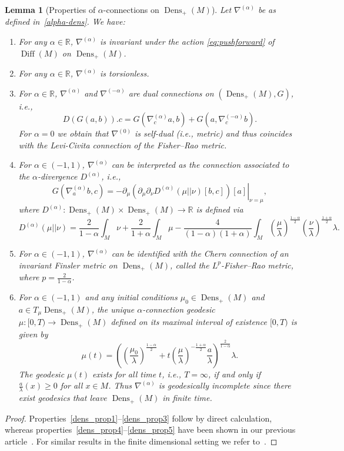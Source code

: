\documentclass[11pt,reqno]{amsart}
\newtheorem{lemma}[theorem]{Lemma}
\theoremstyle{definition}
\newcommand{\R}{\mathbb R}
\newcommand{\dx}{\lambda}
\newcommand{\Dens}{\operatorname{Dens}_+(M)}
\newcommand{\Diff}{\operatorname{Diff}(M)}
\newcommand{\GFR}{G}
\begin{document}
\begin{lemma}[Properties of $\alpha$-connections on $\Dens$]\label{lem:alphacon_dens}
Let $\nabla^{(\alpha)}$ be %
as defined in~\eqref{alpha-dens}. We have:
\begin{enumerate}[label=$(\alph*)$]
\item\label{dens_prop1}For any $\alpha\in \mathbb R$, %
$\nabla^{(\alpha)}$ is invariant under the action \eqref{eq:pushforward} of $\Diff$ on $\Dens$. 
\item For any $\alpha\in \R$, $\nabla^{(\alpha)}$ is torsionless.
\item\label{dens_prop2} For $\alpha\in \mathbb R$, $\nabla^{(\alpha)}$ and $\nabla^{(-\alpha)}$ are dual connections on $(\Dens,\GFR)$, i.e.,
\[
D(G(a,b)).c = G(\nabla^{(\alpha)}_c a,b) + G(a,\nabla^{(-\alpha)}_c b).
\]
For $\alpha=0$ we obtain that $\nabla^{(0)}$ is self-dual (i.e., metric) and thus coincides with the Levi-Civita connection of the Fisher--Rao metric.  
\item\label{dens_prop3} For $\alpha\in (-1,1)$, $\nabla^{(\alpha)}$ 
can be interpreted as the connection associated to the $\alpha$-divergence $D^{(\alpha)}$, i.e.,
$$G(\nabla_a^{(\alpha)}b,c)=-\left.\partial_\mu(\partial_\mu\partial_\nu D^{(\alpha)}(\mu||\nu)[b,c])[a]\right|_{\nu=\mu},$$
where $D^{(\alpha)}:\Dens\times\Dens\to\mathbb R$ is defined  via
\begin{equation}\label{eq:alphadiv}
    D^{(\alpha)}(\mu||\nu) = \frac{2}{1-\alpha}\int_M \nu + \frac{2}{1+\alpha}\int_M \mu -\frac{4}{(1-\alpha)(1+\alpha)}\int_M \left(\frac{\mu}{\dx}\right)^\frac{1-\alpha}{2}\left(\frac{\nu}{\dx}\right)^{\frac{1+\alpha}{2}}\dx.
\end{equation}
\item\label{dens_prop4} For $\alpha\in (-1,1)$,  $\nabla^{(\alpha)}$ can be identified with the Chern connection of an invariant Finsler metric on $\Dens$, called the $L^p$-Fisher--Rao metric, where $p=\frac{2}{1-\alpha}$.
\item\label{dens_prop5} 
For $\alpha\in (-1,1)$ and any initial conditions $\mu_0\in \Dens$ and $a\in T_\mu \Dens$, the unique $\alpha$-connection geodesic $\mu:[0,T)\to \Dens$
    defined on its maximal interval of existence $[0,T)$ is given by
    \begin{equation*}
    \mu(t)=\left(\left(\frac{\mu_0}{\dx}\right)^{\frac{1-\alpha}{2}}+
    t\left(\frac{\mu}{\dx}\right)^{-\frac{1+\alpha}{2}}\frac{a}{\dx}\right)^{\frac{2}{1-\alpha}} \dx.
    \end{equation*}
    The geodesic $\mu(t)$ exists for all time $t$, i.e., $T=\infty$, if and only if $\frac{a}{\dx}(x)\geq0$ for all $x\in M$.
    Thus $\nabla^{(\alpha)}$ is  geodesically incomplete since there exist geodesics that leave $\Dens$ in finite time. 
\end{enumerate}
\end{lemma}
\begin{proof}
Properties~\ref{dens_prop1}--\ref{dens_prop3} follow by direct calculation, whereas properties~\ref{dens_prop4}--\ref{dens_prop5} have been shown in our previous article~\cite{bauer2024p}. For similar results in the finite dimensional setting we refer to~\cite[Section 2.5.2.]{ay2017information}.
\end{proof}
\end{document}
